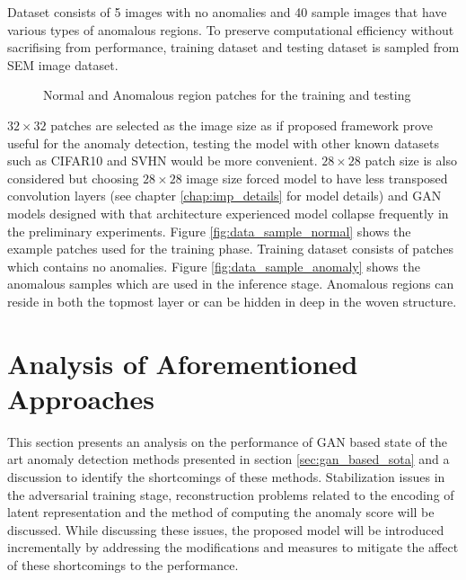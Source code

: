 Dataset consists of 5 images with no anomalies and 40 sample images that have various types of
anomalous regions. To preserve computational efficiency without sacrifising from performance,
training dataset and testing dataset is sampled from SEM image dataset.
\begin{figure}[h!] 
	\hspace*{\fill} 
	\caption{Normal and Anomalous region patches for the training and testing}
	\label{fig:data_samples}
\end{figure}

$32 \times 32$ patches are selected as the image size as if proposed framework prove useful for the
anomaly detection, testing the model with other known datasets such as CIFAR10 \cite{cifar10} and
SVHN \cite{Netzer2011ReadingDI} would be more convenient. $28 \times 28$ patch size is also
considered but choosing $28 \times 28$ image size forced model to have less transposed convolution
layers (see chapter \ref{chap:imp_details} for model details) and GAN models designed with that
architecture experienced model collapse frequently in the preliminary experiments. Figure
\ref{fig:data_sample_normal} shows the example patches used for the training phase. Training dataset
consists of patches which contains no anomalies. Figure \ref{fig:data_sample_anomaly} shows the
anomalous samples which are used in the inference stage. Anomalous regions can reside in both
the topmost layer or can be hidden in deep in the woven structure.

\section{Analysis of Aforementioned Approaches}
\label{sec:analysis_before}

This section presents an analysis on the performance of GAN based state of the art anomaly detection
methods presented in section \ref{sec:gan_based_sota} and a discussion to identify the shortcomings
of these methods. Stabilization issues in the adversarial training stage, reconstruction problems
related to the encoding of latent representation and the method of computing the anomaly score will
be discussed. While discussing these issues, the proposed model will be introduced incrementally by
addressing the modifications and measures to mitigate the affect of these shortcomings to the
performance.

